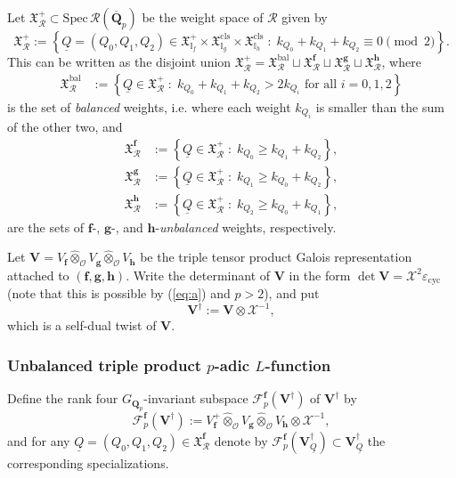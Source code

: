 \documentclass[10pt,letterpaper]{amsart}
\theoremstyle{plain}
\theoremstyle{definition}
\theoremstyle{definition}
\theoremstyle{plain}
\theoremstyle{plain}
\theoremstyle{plain}
\theoremstyle{remark}
\numberwithin{equation}{section}
\DeclareMathOperator{\bal}{\mathrm{bal}}
\def\cO{\mathcal O}
\newcommand{\VQdag}{{\mathbf{V}_{\underline{Q}}^\dagger}}
\newcommand{\Vdag}{{\mathbf{V}^\dagger}}
\newcommand{\Q}{\mathbf{Q}}
\newcommand{\cR}{\mathbb{I}}
\newcommand{\bff}{{\boldsymbol{f}}}
\newcommand{\bfg}{{\boldsymbol{g}}}
\newcommand{\bfh}{{\boldsymbol{h}}}
\begin{document}
Let $\mathfrak{X}_{\mathcal{R}}^+\subset{\mathrm{Spec}}\,\mathcal{R}(\overline{\Q}_p)$ be the weight space of $\mathcal{R}$ given by
\[
\mathfrak{X}_{\mathcal{R}}^+:=\left\{\underline{Q}=(Q_0,Q_1,Q_2)\in\mathfrak{X}_{\cR_f}^+\times\mathfrak{X}_{\cR_g}^{\mathrm{cls}}\times\mathfrak{X}_{\cR_h}^{\mathrm{cls}}\;:\;k_{Q_0}+k_{Q_1}+k_{Q_2}\equiv 0\pmod{2}\right\}.
\] 
This can be written as the disjoint union $\mathfrak{X}_{\mathcal{R}}^+=\mathfrak{X}_{\mathcal{R}}^{\bal}\sqcup\mathfrak{X}_{\mathcal{R}}^{\bff}\sqcup\mathfrak{X}_{\mathcal{R}}^{\bfg}\sqcup\mathfrak{X}_{\mathcal{R}}^{\bfh}$, where
\begin{align*}
\mathfrak{X}_{\mathcal{R}}^{\bal}&:=\left\{\underline{Q}\in\mathfrak{X}_{\mathcal{R}}^+\;:\;\textrm{$k_{Q_0}+k_{Q_1}+k_{Q_2}> 2k_{Q_i}$ for all $i=0,1,2$}\right\}
\end{align*}
is the set of \emph{balanced} weights, i.e. where each weight $k_{Q_i}$ is smaller than the sum of the other two, and
\begin{align*}
\mathfrak{X}_{\mathcal{R}}^\bff&:=\left\{\underline{Q}\in\mathfrak{X}_{\mathcal{R}}^+\;:\;\textrm{$k_{Q_0}\geq k_{Q_1}+k_{Q_2}$}\right\},\\
\mathfrak{X}_{\mathcal{R}}^\bfg&:=\left\{\underline{Q}\in\mathfrak{X}_{\mathcal{R}}^+\;:\;\textrm{$k_{Q_1}\geq k_{Q_0}+k_{Q_2}$}\right\},\\
\mathfrak{X}_{\mathcal{R}}^\bfh&:=\left\{\underline{Q}\in\mathfrak{X}_{\mathcal{R}}^+\;:\;\textrm{$k_{Q_2}\geq k_{Q_0}+k_{Q_1}$}\right\},
\end{align*}
are the sets of $\bff$-, $\bfg$-, and $\bfh$-\emph{unbalanced} weights, respectively.

Let $\mathbf{V}=V_\bff\hat\otimes_{\cO}V_{\bfg}\hat\otimes_{\cO}V_{\bfh}$ be the triple tensor product Galois representation attached to $(\bff,\bfg,\bfh)$. Write the determinant of $\mathbf{V}$ in the form $\det\mathbf{V}=\mathcal{X}^2\varepsilon_{\mathrm{cyc}}$ (note that this is possible by (\ref{eq:a}) and $p>2$), and put  
\begin{equation}\label{eq:crit-twist}
\Vdag:=\mathbf{V}\otimes\mathcal{X}^{-1},
\end{equation}
which is a self-dual twist of $\mathbf{V}$. 

\subsubsection{Unbalanced triple product $p$-adic $L$-function}

Define the rank four $G_{\Q_p}$-invariant subspace $\mathscr{F}_p^\bff(\Vdag)$ of $\Vdag$ by
\begin{equation}\label{eq:unb-intro}
\mathscr{F}_p^\bff(\Vdag):=V_{\bff}^+\hat\otimes_{\cO}V_\bfg\hat\otimes_{\cO}V_{\bfh}\otimes\mathcal{X}^{-1},
\end{equation}
and for any $\underline{Q}=(Q_0,Q_1,Q_2)\in\mathfrak{X}_{\mathcal{R}}^\bff$  denote by $\mathscr{F}_p^\bff(\VQdag)\subset\VQdag$  the corresponding specializations. 
\end{document}
